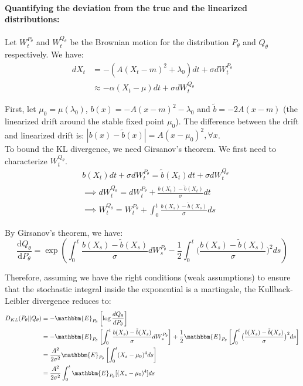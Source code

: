 \documentclass[12pt,a4paper]{article}
\theoremstyle{definition}
\theoremstyle{plain}
\newcommand{\dd}{\mathrm{d}}
\begin{document}
\paragraph{Quantifying the deviation from the true and the linearized distributions:}

\noindent Let $W_t^{P_\theta}$ and $W_t^{Q_\theta}$ be the Brownian motion for the distribution $P_\theta$ and $Q_\theta$ respectively. We have:
\begin{align}
    dX_t &= -(A(X_t - m)^2 + \lambda_0)dt + \sigma dW_t^{P_\theta} \\
    & \approx - \alpha(X_t - \mu)dt + \sigma dW_t^{Q_\theta}
\end{align}

\noindent First, let $\mu_0 = \mu(\lambda_0)$, $b(x) = -A(x - m)^2 - \lambda_0$ and $\tilde{b} = -2A(x - m)$ (the linearized drift around the stable fixed point $\mu_0$). The difference between the drift and linearized drift is: $|b(x) - \tilde{b}(x)| = A(x - \mu_0)^2, \forall x$. \\

To bound the KL divergence, we need Girsanov's theorem. We first need to characterize $W_t^{Q_\theta}$. 
\begin{align}
    & b(X_t)dt + \sigma dW_t^{P_\theta} = \tilde{b}(X_t)dt + \sigma dW_t^{Q_\theta} \\
    &\implies dW_t^{Q_\theta} = dW_t^{P_\theta} + \frac{b(X_t) - \tilde{b}(X_t)}{\sigma}dt \\
    & \implies W_t^{Q_\theta} = W_t^{P_\theta} + \int_0^t \frac{b(X_s) - \tilde{b}(X_s)}{\sigma}ds
\end{align}


By Girsanov's theorem, we have:
$$
\frac{\dd Q_\theta}{\dd P_\theta} = \exp \left( \int_0^t \frac{b(X_s) - \tilde{b}(X_s)}{\sigma}dW_s^{P_\theta} - \frac{1}{2} \int_0^t \big( \frac{b(X_s) - \tilde{b}(X_s)}{\sigma} \big)^2ds \right)
$$

Therefore, assuming we have the right conditions (weak assumptions) to ensure that the stochastic integral inside the exponential is a martingale, the Kullback-Leibler divergence reduces to: 
\begin{align}
    D_{KL}(P_\theta || Q_\theta) &= - \mathbbm{E}_{P_\theta} \left[ \log \frac{dQ_\theta}{dP_\theta} \right] \\
    &= -\mathbbm{E}_{P_\theta} \left[ \int_0^t \frac{b(X_s) - \tilde{b}(X_s)}{\sigma}dW_s^{P_\theta} \right] + \frac{1}{2} \mathbbm{E}_{P_\theta} \left[ \int_0^t \big( \frac{b(X_s) - \tilde{b}(X_s)}{\sigma} \big)^2ds \right] \\
    &=  \frac{A^2}{2 \sigma^2} \mathbbm{E}_{P_\theta} \left[ \int_0^t (X_s - \mu_0)^4ds \right] \\
    &= \frac{A^2}{2 \sigma^2} \int_0^t \mathbbm{E}_{P_\theta}[(X_s - \mu_0)^4]ds
\end{align}
\end{document}
